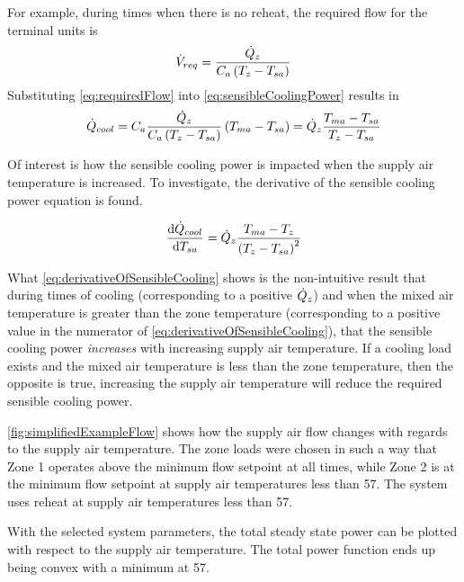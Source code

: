 For example, during times when there is no reheat, the required flow for
the terminal units is 
\begin{equation}\label{eq:requiredFlow}
    \dot{V}_{req} = \frac{\dot{Q}_{z}}{C_{a} \left(T_{z} - T_{sa}{}\right)}
\end{equation}
%
Substituting  \ref{eq:requiredFlow} into  
 \ref{eq:sensibleCoolingPower} results in
%
\begin{equation}
    \dot{Q}_{cool} = C_{a}  \frac{\dot{Q}_{z}}{C_{a} \left(T_{z} -
    T_{sa}{}\right)}\left(T_{ma}{} - T_{sa}{}\right) = \dot{Q}_{z}
    \frac{T_{ma}{} - T_{sa}{}}{T_{z} - T_{sa}{}}
\end{equation}


Of interest is how the sensible cooling power is impacted when
the supply air temperature is increased. To investigate, the derivative
of the sensible cooling power equation is found.

\begin{equation}\label{eq:derivativeOfSensibleCooling}
    \dv{\dot{Q}_{cool}}{T_{sa}{}} = \dot{Q}_{z} \frac{T_{ma}{} -
    T_{z}}{\left(T_{z} - T_{sa}{}\right)^{2}}
\end{equation}

What  \ref{eq:derivativeOfSensibleCooling} shows is the
non-intuitive result that during times of cooling (corresponding to a
positive \(\dot{Q}_{z}\)) and when the mixed air temperature is
greater than the zone temperature (corresponding to a positive value in
the numerator of  \ref{eq:derivativeOfSensibleCooling}), that
the sensible cooling power \textit{increases} with increasing supply air
temperature. If a cooling load exists and the mixed air temperature is
less than the zone temperature, then the opposite is true, increasing
the supply air temperature will reduce the required sensible cooling
power.

\figref{} \ref{fig:simplifiedExampleFlow} shows how the supply air flow
changes with regards to the supply air temperature. The zone loads were
chosen in such a way that Zone 1 operates above the minimum flow
setpoint at all times, while Zone 2 is at the minimum flow setpoint at
supply air temperatures less than \SI{57}{\degreeF}. The system uses
reheat at supply air temperatures less than \SI{57}{\degreeF}. 

With the selected system parameters, the total steady state power can be
plotted with respect to the supply air temperature. The total power
function ends up being convex with a minimum at \SI{57}{\degreeF}. 

